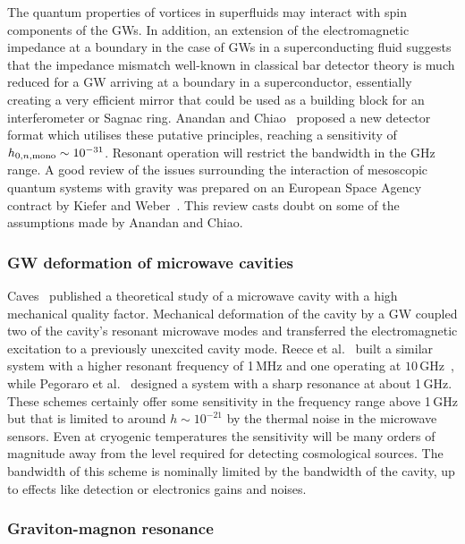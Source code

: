 \documentclass[11pt,a4paper]{article}
\begin{document}
The quantum properties of vortices in superfluids may interact with spin components of the GWs. In addition, an extension of the electromagnetic impedance at a boundary in the case of GWs in a superconducting fluid suggests that the impedance mismatch well-known in classical bar detector theory is much reduced for a GW arriving at a boundary in a superconductor, essentially creating a very efficient mirror that could be used as a building block for an interferometer or Sagnac ring. Anandan and Chiao~\cite{Anandan, Chiao:2002nv} proposed a new detector format which utilises these putative principles, reaching a sensitivity of $h_{0, n, \rm mono} \sim 10^{-31}$. Resonant operation will restrict the bandwidth in the GHz range. A good review of the issues surrounding the interaction of mesoscopic quantum systems with gravity was prepared on an European Space Agency contract by Kiefer and Weber~\cite{Kiefer}. This review casts doubt on some of the assumptions made by Anandan and Chiao.

\subsubsection{GW deformation of microwave cavities}
\label{sec:HighQCavities}

Caves~\cite{Caves} published a theoretical study of a microwave cavity with a high mechanical quality factor. Mechanical deformation of the cavity by a GW coupled two of the cavity's resonant microwave modes and transferred the electromagnetic excitation to a previously unexcited cavity mode. Reece et al.~\cite{Reece} built a similar system with a higher resonant frequency of 1\,MHz and one operating at $10 \, \text{GHz}$~\cite{Reece:1982sc}, while Pegoraro et al.~\cite{Pegoraro} designed a system with a sharp resonance at about 1\,GHz. These schemes certainly offer some sensitivity in the frequency range above 1\,GHz but that is limited to around $h \sim 10^{-21}$ by the thermal noise in the microwave sensors. Even at cryogenic temperatures the sensitivity will be many orders of magnitude away from the level required for detecting cosmological sources. The bandwidth of this scheme is nominally limited by the bandwidth of the cavity, up to effects like detection or electronics gains and noises.


\subsubsection{Graviton-magnon resonance}
\label{sec:GravitonMagnonResonance}
\end{document}
